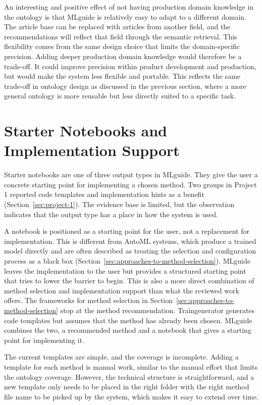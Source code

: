 An interesting and positive effect of not having 
production domain knowledge in the ontology is that MLguide is 
relatively easy to adapt to a different domain. The article base can 
be replaced with articles from another field, and the recommendations 
will reflect that field through the semantic retrieval. This 
flexibility comes from the same design choice that limits the 
domain-specific precision. Adding deeper production domain knowledge 
would therefore be a trade-off. It could improve precision within 
product development and production, but would make the system less 
flexible and portable. This reflects the same trade-off in ontology 
design as discussed in the previous section, where 
a more general ontology is more reusable but less directly suited to a 
specific task.

\section{Starter Notebooks and Implementation Support}
\label{sec:starter-notebooks-and-implementation-support}

Starter notebooks are one of three output types in MLguide. 
They give the user a concrete starting point for implementing 
a chosen method. Two groups in Project 1 reported code 
templates and implementation hints as a benefit 
(Section~\ref{sec:project-1}). The evidence base is limited, 
but the observation indicates that the output type has a place 
in how the system is used.

A notebook is positioned as a starting point for the user, not 
a replacement for implementation. This is different from 
AutoML systems, which produce a trained model directly and are often 
described as treating the selection and configuration process as a black box
(Section~\ref{sec:approaches-to-method-selection}). MLguide 
leaves the implementation to the user but provides a 
structured starting point that tries to lower the barrier to begin. 
This is also a more direct combination of method selection and 
implementation support than what the reviewed work offers. The 
frameworks for method selection in 
Section~\ref{sec:approaches-to-method-selection} stop at the 
method recommendation. Traingenerator 
\parencite{rieke2021traingenerator} generates code templates 
but assumes that the method has already been chosen. MLguide 
combines the two, a recommended method and a notebook that 
gives a starting point for implementing it.

The current templates are simple, and the coverage is 
incomplete. Adding 
a template for each method is manual work, similar to the 
manual effort that limits the ontology coverage. However, the 
technical structure is straightforward, and a new 
template only needs to be placed in the right folder with the right
method file name
to be picked up by the system, which makes it easy to extend over 
time.

